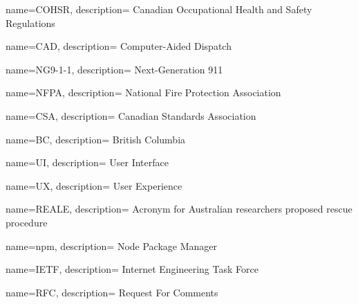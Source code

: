 {
  name={COHSR},
  description={
    Canadian Occupational Health and Safety Regulations
  }
}

{
  name={CAD},
  description={
    Computer-Aided Dispatch
  }
}

{
  name={NG9-1-1},
  description={
    Next-Generation 911
  }
}

{
  name={NFPA},
  description={
    National Fire Protection Association
  }
}

{
  name={CSA},
  description={
    Canadian Standards Association
  }
}

{
  name={BC},
  description={
    British Columbia
  }
}

{
  name={UI},
  description={
    User Interface
  }
}

{
  name={UX},
  description={
    User Experience
  }
}

{
  name={REALE},
  description={
    Acronym for Australian researchers proposed rescue procedure
  }
}

{
  name={npm},
  description={
    Node Package Manager
  }
}

{
  name={IETF},
  description={
    Internet Engineering Task Force
  }
}

{
  name={RFC},
  description={
    Request For Comments
  }
}
